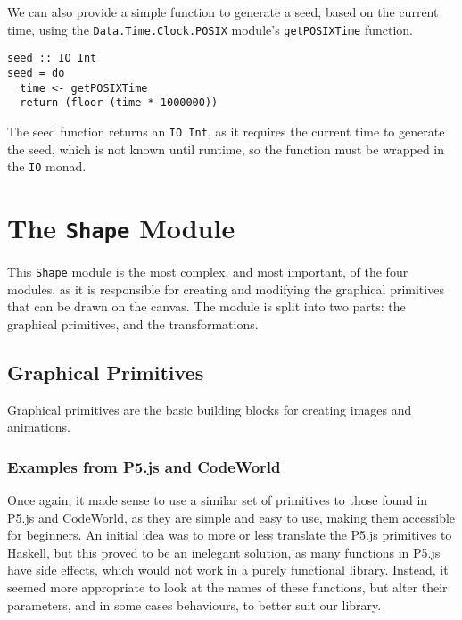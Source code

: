 \documentclass[../main.tex]{subfiles}
\begin{document}
            We can also provide a simple function to generate a seed, based on the current
                time, using the \texttt{Data.Time.Clock.POSIX} module's \texttt{getPOSIXTime}
                function.

            \begin{lstlisting}[label={lst:seed}, caption={The \texttt{seed} function.}]
seed :: IO Int
seed = do
  time <- getPOSIXTime
  return (floor (time * 1000000))\end{lstlisting}

            The seed function returns an \texttt{IO Int}, as it requires the current time
                to generate the seed, which is not known until runtime, so the function must be
                wrapped in the \texttt{IO} monad.

    \section{The \texttt{Shape}
        Module} This \texttt{Shape} module is the most complex, and most important, of
            the four modules, as it is responsible for creating and modifying the graphical
            primitives that can be drawn on the canvas.
        The module is split into two parts: the graphical primitives, and the
            transformations.

        \subsection{Graphical Primitives}
            Graphical primitives are the basic building blocks for creating images and
                animations.

            \subsubsection{Examples from P5.js and CodeWorld}
                Once again, it made sense to use a similar set of primitives to those found in
                    P5.js and CodeWorld, as they are simple and easy to use, making them accessible
                    for beginners.
                An initial idea was to more or less translate the P5.js primitives to Haskell,
                    but this proved to be an inelegant solution, as many functions in P5.js have
                    side effects, which would not work in a purely functional library.
                Instead, it seemed more appropriate to look at the names of these functions,
                    but alter their parameters, and in some cases behaviours, to better suit our
                    library.
\end{document}
